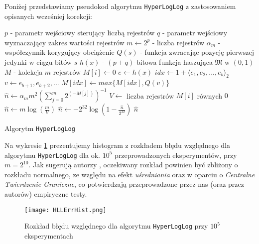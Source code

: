  Poniżej przedstawiamy pseudokod algorytmu \texttt{HyperLogLog} z zastosowaniem opisanych wcześniej korekcji:
\newline
\begin{algorithm}
    \begin{algorithmic}
    \State $p $ - parametr wejściowy sterujący liczbą rejestrów
    \State $q $ - parametr wejściowy wyznaczający zakres wartości rejestrów
    \State $m \gets 2^p$ - liczba rejestrów
    \State ${\alpha}_m $ - współczynnik korygujący obciążenie
    \State $Q(s) $ -  funkcja zwracając pozycję pierwszej jedynki w ciągu bitów $s$ 
    \State $h(x)  $  - $(p + q)$-bitowa funkcja haszująca $\mathfrak{M}$ w $(0, 1)$
    \State $M $  - kolekcja $m$ rejestrów 
    \newline
        \State $M[i] \gets 0$
    \EndFor
    \newline
        \State $e \gets h(x)$
        \State $idx \gets 1 + {{\langle}e_1, e_2, ..., e_b{\rangle}}_2$
        \State $v \gets e_{b+1}, e_{b+2}, ...$
        \State $M[idx] \gets max\{M[idx], Q(v)\}$
    \EndFunction
    \newline
        \State $\hat{n} \gets {\alpha}_{m}{m}^2(\sum_{j=0}^{m} 2^{(-M[j])})^{-1}$
            \State $V \gets $ liczba rejestrów $M[i]$ równych $0$
                \State $\hat{n} \gets {m}\log(\frac{m}{V})$
            \EndIf
            \State $\hat{n} \gets -2^{32}\log(1 - \frac{\hat{n}}{2^{32}})$
        \EndIf
        \State \Return $\hat{n}$
    \EndFunction
    
    \end{algorithmic}
    \caption{Algorytm \texttt{HyperLogLog}}
\end{algorithm}

Na wykresie \ref{fig:hll_hist} prezentujemy histogram z rozkładem błędu względnego dla algorytmu \texttt{HyperLogLog} dla ok. $10^5$ przeprowadzonych eksperymentów, przy $m=2^{10}$. Jak sugerują autorzy \cite{hll}, oczekiwany rozkład powinien być zbliżony o rozkładu normalnego, ze względu na efekt \textit{uśredniania} oraz w oparciu o \textit{Centralne Twierdzenie Graniczne}, co potwierdzają przeprowadzone przez nas (oraz przez autorów) empiryczne testy.

\begin{figure}[h!]
	\texttt{[image: HLLErrHist.png]}
	\centering
	\caption{Rozkład błędu względnego dla algorytmu \texttt{HyperLogLog} przy $10^5$ eksperymentach}
	\label{fig:hll_hist}
\end{figure}